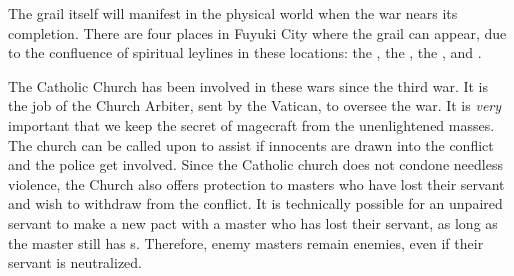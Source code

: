 \documentclass[blue]{FateDarkDawn}
\begin{document}
The grail itself will manifest in the physical world when the war nears its completion. There are four places in Fuyuki City where the grail can appear, due to the confluence of spiritual leylines in these locations: the \pChurch{}, the \pTEstate{}, the \pConvention{}, and \pTemple{}.

The Catholic Church has been involved in these wars since the third war. It is the job of the Church Arbiter, sent by the Vatican, to oversee the war. It is \emph{very} important that we keep the secret of magecraft from the unenlightened masses. The church can be called upon to assist if innocents are drawn into the conflict and the police get involved. Since the Catholic church does not condone needless violence, the Church also offers protection to masters who have lost their servant and wish to withdraw from the conflict. It is technically possible for an unpaired servant to make a new pact with a master who has lost their servant, as long as the master still has \iCommand{\MYname}s. Therefore, enemy masters remain enemies, even if their servant is neutralized.
\end{document}
